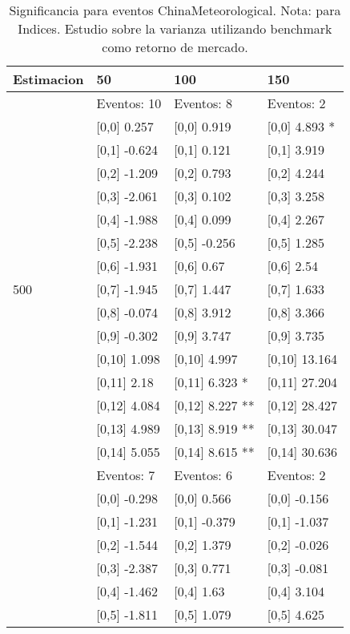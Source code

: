 \begin{table}

\caption{Significancia para eventos ChinaMeteorological. Nota: para Indices. Estudio sobre la varianza utilizando benchmark como retorno de mercado.}
\centering
\begin{tabular}[t]{llll}
\toprule
Estimacion & 50 & 100 & 150\\
\midrule
 & Eventos:  10 & Eventos:  8 & Eventos:  2\\
 & {}[0,0] 0.257 & {}[0,0] 0.919 & {}[0,0] 4.893 *\\
 & {}[0,1] -0.624 & {}[0,1] 0.121 & {}[0,1] 3.919\\
 & {}[0,2] -1.209 & {}[0,2] 0.793 & {}[0,2] 4.244\\
 & {}[0,3] -2.061 & {}[0,3] 0.102 & {}[0,3] 3.258\\
\addlinespace
 & {}[0,4] -1.988 & {}[0,4] 0.099 & {}[0,4] 2.267\\
 & {}[0,5] -2.238 & {}[0,5] -0.256 & {}[0,5] 1.285\\
 & {}[0,6] -1.931 & {}[0,6] 0.67 & {}[0,6] 2.54\\
500 & {}[0,7] -1.945 & {}[0,7] 1.447 & {}[0,7] 1.633\\
 & {}[0,8] -0.074 & {}[0,8] 3.912 & {}[0,8] 3.366\\
\addlinespace
 & {}[0,9] -0.302 & {}[0,9] 3.747 & {}[0,9] 3.735\\
 & {}[0,10] 1.098 & {}[0,10] 4.997 & {}[0,10] 13.164\\
 & {}[0,11] 2.18 & {}[0,11] 6.323 * & {}[0,11] 27.204\\
 & {}[0,12] 4.084 & {}[0,12] 8.227 ** & {}[0,12] 28.427\\
 & {}[0,13] 4.989 & {}[0,13] 8.919 ** & {}[0,13] 30.047\\
\addlinespace
 & {}[0,14] 5.055 & {}[0,14] 8.615 ** & {}[0,14] 30.636\\
 & Eventos:  7 & Eventos:  6 & Eventos:  2\\
 & {}[0,0] -0.298 & {}[0,0] 0.566 & {}[0,0] -0.156\\
 & {}[0,1] -1.231 & {}[0,1] -0.379 & {}[0,1] -1.037\\
 & {}[0,2] -1.544 & {}[0,2] 1.379 & {}[0,2] -0.026\\
\addlinespace
 & {}[0,3] -2.387 & {}[0,3] 0.771 & {}[0,3] -0.081\\
 & {}[0,4] -1.462 & {}[0,4] 1.63 & {}[0,4] 3.104\\
 & {}[0,5] -1.811 & {}[0,5] 1.079 & {}[0,5] 4.625\\

\end{tabular}
\end{table}
